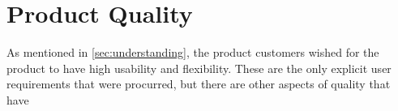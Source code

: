 \section{Product Quality}
As mentioned in \autoref{sec:understanding}, the product customers wished for the product to have high usability and flexibility. 
These are the only explicit user requirements that were procurred, but there are other aspects of quality that have 